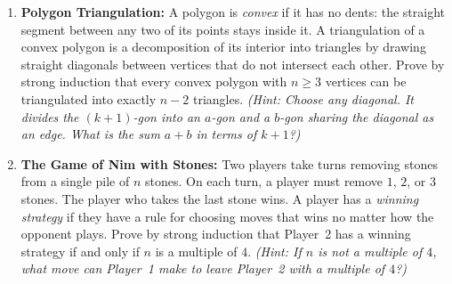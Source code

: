 \begin{enumerate}
\item \textbf{Polygon Triangulation:} 
A polygon is \emph{convex} if it has no dents: the straight segment between any two of its points stays inside it. A triangulation of a convex polygon is a decomposition of its interior into triangles by drawing straight diagonals between vertices that do not intersect each other.
Prove by strong induction that every convex polygon with $n \ge 3$ vertices can be triangulated into exactly $n - 2$ triangles.
\emph{(Hint: Choose any diagonal. It divides the $(k+1)$-gon into an $a$-gon and a $b$-gon sharing the diagonal as an edge. What is the sum $a + b$ in terms of $k+1$?)}

\item \textbf{The Game of Nim with Stones:} 
Two players take turns removing stones from a single pile of $n$ stones. On each turn, a player must remove $1$, $2$, or $3$ stones. The player who takes the last stone wins.
A player has a \emph{winning strategy} if they have a rule for choosing moves that wins no matter how the opponent plays.
Prove by strong induction that Player~2 has a winning strategy if and only if $n$ is a multiple of $4$.
\emph{(Hint: If $n$ is not a multiple of $4$, what move can Player~1 make to leave Player~2 with a multiple of $4$?)}
\end{enumerate}

\newpage
